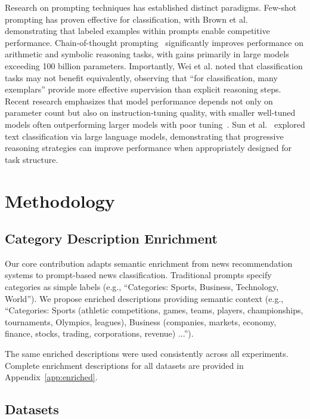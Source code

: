 \documentclass[sigconf,nonacm]{acmart}
\begin{document}
Research on prompting techniques has established distinct paradigms. Few-shot prompting has proven effective for classification, with Brown et al.~\cite{brown2020language} demonstrating that labeled examples within prompts enable competitive performance. Chain-of-thought prompting~\cite{wei2022chain} significantly improves performance on arithmetic and symbolic reasoning tasks, with gains primarily in large models exceeding 100 billion parameters. Importantly, Wei et al. noted that classification tasks may not benefit equivalently, observing that ``for classification, many exemplars'' provide more effective supervision than explicit reasoning steps. Recent research emphasizes that model performance depends not only on parameter count but also on instruction-tuning quality, with smaller well-tuned models often outperforming larger models with poor tuning~\cite{zhang2023instruction, gretz2023zero}. Sun et al.~\cite{sun2023text} explored text classification via large language models, demonstrating that progressive reasoning strategies can improve performance when appropriately designed for task structure.

\section{Methodology}

\subsection{Category Description Enrichment}

Our core contribution adapts semantic enrichment from news recommendation systems to prompt-based news classification. Traditional prompts specify categories as simple labels (e.g., ``Categories: Sports, Business, Technology, World''). We propose enriched descriptions providing semantic context (e.g., ``Categories: Sports (athletic competitions, games, teams, players, championships, tournaments, Olympics, leagues), Business (companies, markets, economy, finance, stocks, trading, corporations, revenue) ...'').

The same enriched descriptions were used consistently across all experiments. Complete enrichment descriptions for all datasets are provided in Appendix~\ref{app:enriched}.

\subsection{Datasets}
\end{document}
